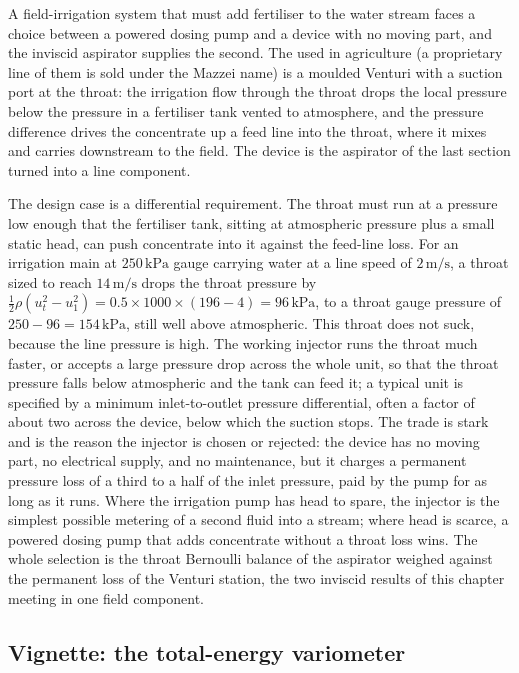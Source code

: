 A field-irrigation system that must add fertiliser to the water stream
faces a choice between a powered dosing pump and a device with no
moving part, and the inviscid aspirator supplies the second. The
 used in agriculture (a proprietary line of
them is sold under the Mazzei name) is a moulded Venturi with a suction
port at the throat: the irrigation flow through the throat drops the
local pressure below the pressure in a fertiliser tank vented to
atmosphere, and the pressure difference drives the concentrate up a
feed line into the throat, where it mixes and carries downstream to the
field. The device is the aspirator of the last section turned into a
line component.

The design case is a differential requirement. The throat must run at
a pressure low enough that the fertiliser tank, sitting at atmospheric
pressure plus a small static head, can push concentrate into it against
the feed-line loss. For an irrigation main at $250\,\text{kPa}$ gauge
carrying water at a line speed of $2\,\si{\meter\per\second}$, a throat
sized to reach $14\,\si{\meter\per\second}$ drops the throat pressure by
$\tfrac12\rho(u_t^2 - u_1^2) = 0.5\times 1000\times(196 - 4) =
96\,\text{kPa}$, to a throat gauge pressure of $250 - 96 =
154\,\text{kPa}$, still well above atmospheric. This throat does not
suck, because the line pressure is high. The working injector runs the
throat much faster, or accepts a large pressure drop across the whole
unit, so that the throat pressure falls below atmospheric and the tank
can feed it; a typical unit is specified by a minimum inlet-to-outlet
pressure differential, often a factor of about two across the device,
below which the suction stops. The trade is stark and is the reason the
injector is chosen or rejected: the device has no moving part, no
electrical supply, and no maintenance, but it charges a permanent
pressure loss of a third to a half of the inlet pressure, paid by the
pump for as long as it runs. Where the irrigation pump has head to
spare, the injector is the simplest possible metering of a second
fluid into a stream; where head is scarce, a powered dosing pump that
adds concentrate without a throat loss wins. The whole selection is the
throat Bernoulli balance of the aspirator weighed against the permanent
loss of the Venturi station, the two inviscid results of this chapter
meeting in one field component.

\subsection{Vignette: the total-energy variometer}

